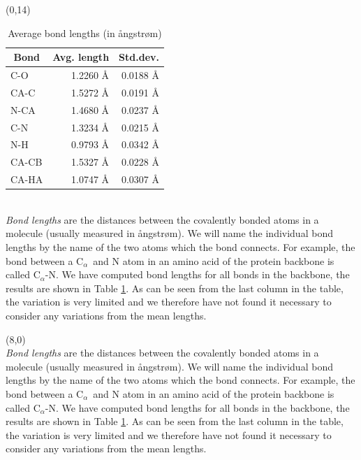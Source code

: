 \documentclass[a0,portrait]{a0poster}
\def\Head#1{\noindent{\huge \bfseries #1}}
\newcommand{\Ca}{C$_{\alpha}${}}
\begin{document}
\begin{textblock}{7}(0,14)
\begin{table}
\addtolength\leftskip{9mm}
  \begin{tabular}{lrr}
    \toprule
    \multicolumn{1}{c}{Bond} & \multicolumn{1}{c}{Avg. length} & \multicolumn{1}{c}{Std.dev.} \\ \midrule 
    C-O   & 1.2260 Å & 0.0188 Å\\
    CA-C  & 1.5272 Å & 0.0191 Å\\
    N-CA  & 1.4680 Å & 0.0237 Å\\
    C-N   & 1.3234 Å & 0.0215 Å\\
    N-H   & 0.9793 Å & 0.0342 Å\\
    CA-CB & 1.5327 Å & 0.0228 Å\\
    CA-HA & 1.0747 Å & 0.0307 Å\\ \bottomrule
  \end{tabular}
  \label{tab:average_bond_lengths}
  \caption{Average bond lengths (in ångstrøm)}
\end{table}
  \Head{Protein structure} \\\textit{Bond lengths} are the distances between the covalently bonded atoms
in a molecule (usually measured in ångstrøm). We will name the
individual bond lengths by the name of the two atoms which the bond
connects. For example, the bond between a \Ca\ and N atom in an amino acid of
the protein backbone is called \Ca -N. We have computed bond lengths
for all bonds in the backbone, the results are shown in Table
\ref{tab:average_bond_lengths}. As can be seen from the last column in
the table, the variation is very limited and we therefore have not
found it necessary to consider any variations from the mean
lengths. 
\end{textblock}

\begin{textblock}{7}(8,0)
\Head{Backbone fitting}\\
\textit{Bond lengths} are the distances between the covalently bonded atoms
in a molecule (usually measured in ångstrøm). We will name the
individual bond lengths by the name of the two atoms which the bond
connects. For example, the bond between a \Ca\ and N atom in an amino acid of
the protein backbone is called \Ca -N. We have computed bond lengths
for all bonds in the backbone, the results are shown in Table
\ref{tab:average_bond_lengths}. As can be seen from the last column in
the table, the variation is very limited and we therefore have not
found it necessary to consider any variations from the mean
lengths.
\end{textblock}
\end{document}
